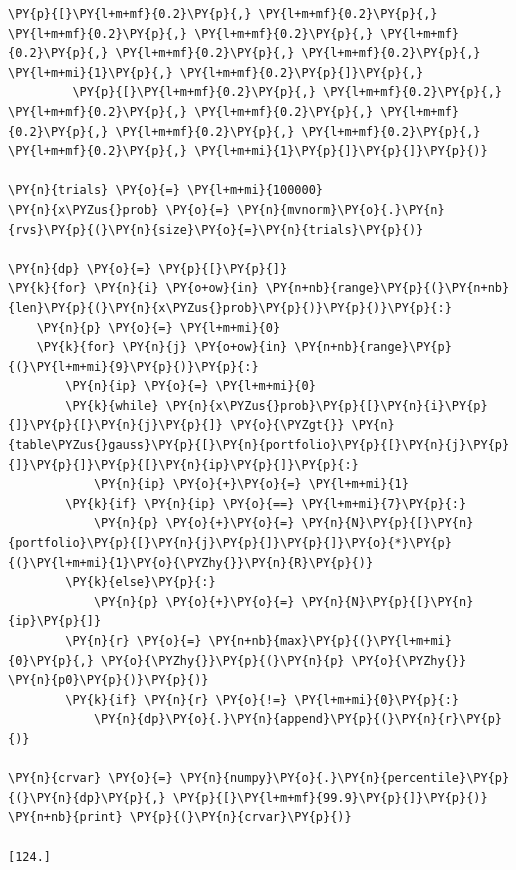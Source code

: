 \begin{tcolorbox}[breakable, size=fbox, boxrule=1pt, pad at break*=1mm,colback=cellbackground, colframe=cellborder]
\begin{Verbatim}[commandchars=\\\{\}]
         \PY{p}{[}\PY{l+m+mf}{0.2}\PY{p}{,} \PY{l+m+mf}{0.2}\PY{p}{,} \PY{l+m+mf}{0.2}\PY{p}{,} \PY{l+m+mf}{0.2}\PY{p}{,} \PY{l+m+mf}{0.2}\PY{p}{,} \PY{l+m+mf}{0.2}\PY{p}{,} \PY{l+m+mf}{0.2}\PY{p}{,} \PY{l+m+mi}{1}\PY{p}{,} \PY{l+m+mf}{0.2}\PY{p}{]}\PY{p}{,}
         \PY{p}{[}\PY{l+m+mf}{0.2}\PY{p}{,} \PY{l+m+mf}{0.2}\PY{p}{,} \PY{l+m+mf}{0.2}\PY{p}{,} \PY{l+m+mf}{0.2}\PY{p}{,} \PY{l+m+mf}{0.2}\PY{p}{,} \PY{l+m+mf}{0.2}\PY{p}{,} \PY{l+m+mf}{0.2}\PY{p}{,} \PY{l+m+mf}{0.2}\PY{p}{,} \PY{l+m+mi}{1}\PY{p}{]}\PY{p}{]}\PY{p}{)}
		
\PY{n}{trials} \PY{o}{=} \PY{l+m+mi}{100000}
\PY{n}{x\PYZus{}prob} \PY{o}{=} \PY{n}{mvnorm}\PY{o}{.}\PY{n}{rvs}\PY{p}{(}\PY{n}{size}\PY{o}{=}\PY{n}{trials}\PY{p}{)}
		
\PY{n}{dp} \PY{o}{=} \PY{p}{[}\PY{p}{]}
\PY{k}{for} \PY{n}{i} \PY{o+ow}{in} \PY{n+nb}{range}\PY{p}{(}\PY{n+nb}{len}\PY{p}{(}\PY{n}{x\PYZus{}prob}\PY{p}{)}\PY{p}{)}\PY{p}{:}
    \PY{n}{p} \PY{o}{=} \PY{l+m+mi}{0}
    \PY{k}{for} \PY{n}{j} \PY{o+ow}{in} \PY{n+nb}{range}\PY{p}{(}\PY{l+m+mi}{9}\PY{p}{)}\PY{p}{:}
        \PY{n}{ip} \PY{o}{=} \PY{l+m+mi}{0}
        \PY{k}{while} \PY{n}{x\PYZus{}prob}\PY{p}{[}\PY{n}{i}\PY{p}{]}\PY{p}{[}\PY{n}{j}\PY{p}{]} \PY{o}{\PYZgt{}} \PY{n}{table\PYZus{}gauss}\PY{p}{[}\PY{n}{portfolio}\PY{p}{[}\PY{n}{j}\PY{p}{]}\PY{p}{]}\PY{p}{[}\PY{n}{ip}\PY{p}{]}\PY{p}{:}
            \PY{n}{ip} \PY{o}{+}\PY{o}{=} \PY{l+m+mi}{1}
        \PY{k}{if} \PY{n}{ip} \PY{o}{==} \PY{l+m+mi}{7}\PY{p}{:}
            \PY{n}{p} \PY{o}{+}\PY{o}{=} \PY{n}{N}\PY{p}{[}\PY{n}{portfolio}\PY{p}{[}\PY{n}{j}\PY{p}{]}\PY{p}{]}\PY{o}{*}\PY{p}{(}\PY{l+m+mi}{1}\PY{o}{\PYZhy{}}\PY{n}{R}\PY{p}{)}
        \PY{k}{else}\PY{p}{:}
            \PY{n}{p} \PY{o}{+}\PY{o}{=} \PY{n}{N}\PY{p}{[}\PY{n}{ip}\PY{p}{]}
        \PY{n}{r} \PY{o}{=} \PY{n+nb}{max}\PY{p}{(}\PY{l+m+mi}{0}\PY{p}{,} \PY{o}{\PYZhy{}}\PY{p}{(}\PY{n}{p} \PY{o}{\PYZhy{}} \PY{n}{p0}\PY{p}{)}\PY{p}{)}
        \PY{k}{if} \PY{n}{r} \PY{o}{!=} \PY{l+m+mi}{0}\PY{p}{:}
            \PY{n}{dp}\PY{o}{.}\PY{n}{append}\PY{p}{(}\PY{n}{r}\PY{p}{)}
		
\PY{n}{crvar} \PY{o}{=} \PY{n}{numpy}\PY{o}{.}\PY{n}{percentile}\PY{p}{(}\PY{n}{dp}\PY{p}{,} \PY{p}{[}\PY{l+m+mf}{99.9}\PY{p}{]}\PY{p}{)}
\PY{n+nb}{print} \PY{p}{(}\PY{n}{crvar}\PY{p}{)}

[124.]
\end{Verbatim}
\end{tcolorbox}

